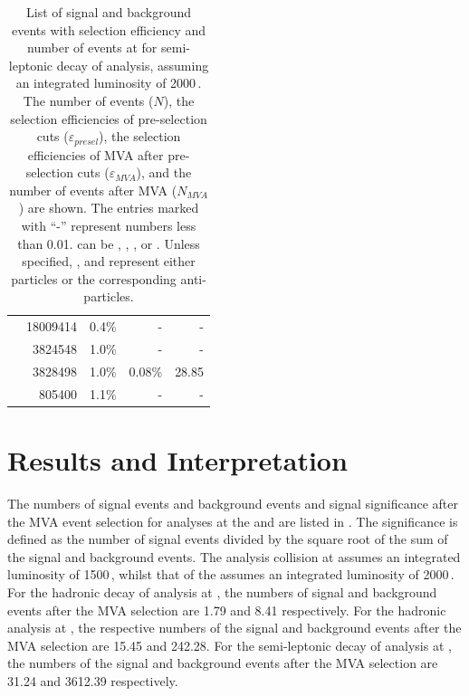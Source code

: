 \begin{table}[!htbp]
\begin{tabular}{lrrrr}
\hline
\gammagamma{\Pphoton}{\BS}{\Pphoton}{\BS}{ \Pquark \Pquark \Pquark \Pquark}& 18009414  & 0.4\%&   - & - \\
\gammagamma{\Pphoton}{\BS}{\Pphoton}{\EPA}{ \Pquark \Pquark \Pquark \Pquark}& 3824548 & 1.0\%&  - & - \\
\gammagamma{\Pphoton}{\EPA}{\Pphoton}{\BS}{ \Pquark \Pquark \Pquark \Pquark}& 3828498 & 1.0\%&  0.08\% & 28.85 \\
\gammagamma{\Pphoton}{\EPA}{\Pphoton}{\EPA}{ \Pquark \Pquark \Pquark \Pquark}& 805400& 1.1\%&  - & - \\
\hline \hline
\end{tabular}
\caption
{List of signal and background events with selection efficiency and number of events at   for semi-leptonic \WW decay of \eeToHHbbWW analysis, assuming an integrated luminosity of 2000\,. The number of events ($N$), the selection efficiencies of pre-selection cuts ($\varepsilon_{presel}$), the selection efficiencies of MVA after pre-selection cuts ($\varepsilon_{MVA}$), and the number of events after MVA ($N_{MVA}$) are shown. The entries marked with ``-'' represent  numbers less than 0.01. \Pquark can be \Pup, \Pdown, \Pstrange, \Pbottom or \Ptop. Unless specified, \Pquark, \Plepton and \Pnu represent either particles or the corresponding anti-particles.}
\label{tab:doubleHiggsQlv3TeVMVA}
\end{table}
\section{Results and Interpretation}
\label{sec:doubleHiggsResults}



The numbers of signal events and background events and signal significance after the MVA event selection for analyses at the  and   are listed in . The significance is defined as the number of signal events divided by the square root of the sum of  the signal and background events. The analysis collision at  assumes an integrated luminosity of 1500\,, whilst that of the  assumes an integrated luminosity of 2000\,.  For the hadronic \WW decay of \eeToHHbbWW analysis at , the numbers of signal and background events after the MVA selection are 1.79 and 8.41 respectively. For the hadronic analysis at , the respective numbers of the signal and background events after the MVA selection are 15.45 and 242.28. For the semi-leptonic \WW decay of \eeToHHbbWW analysis at , the numbers of the signal and background events after the MVA selection are 31.24 and 3612.39 respectively.

